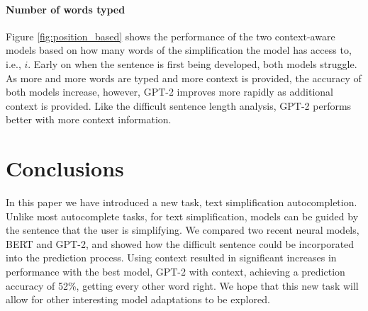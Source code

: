 \documentclass[11pt]{article}
\begin{document}
\vspace{-1mm}
\paragraph{Number of words typed}
Figure \ref{fig:position_based} shows the performance of the two context-aware models based on how many words of the simplification the model has access to, i.e., $i$.  Early on when the sentence is first being developed, both models struggle.  As more and more words are typed and more context is provided, the accuracy of both models increase, however, GPT-2 improves more rapidly as additional context is provided. Like the difficult sentence length analysis, GPT-2 performs better with more context information.



\section{Conclusions}

In this paper we have introduced a new task, text simplification autocompletion.  Unlike most autocomplete tasks, for text simplification, models can be guided by the sentence that the user is simplifying.  We compared two recent neural models, BERT and GPT-2, and showed how the difficult sentence could be incorporated into the prediction process.  Using context resulted in significant increases in performance with the best model, GPT-2 with context, achieving a prediction accuracy of 52\%, getting every other word right.  We hope that this new task will allow for other interesting model adaptations to be explored.
\end{document}
